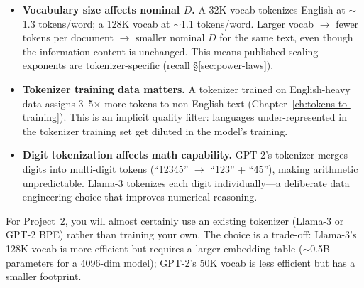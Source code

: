 \begin{itemize}[nosep]
  \item \textbf{Vocabulary size affects nominal $D$.} A 32K vocab tokenizes English at $\sim$1.3 tokens/word; a 128K vocab at $\sim$1.1 tokens/word. Larger vocab $\to$ fewer tokens per document $\to$ smaller nominal $D$ for the same text, even though the information content is unchanged. This means published scaling exponents are tokenizer-specific (recall \S\ref{sec:power-laws}).
  \item \textbf{Tokenizer training data matters.} A tokenizer trained on English-heavy data assigns 3--5$\times$ more tokens to non-English text (Chapter~\ref{ch:tokens-to-training}). This is an implicit quality filter: languages under-represented in the tokenizer training set get diluted in the model's training.
  \item \textbf{Digit tokenization affects math capability.} GPT-2's tokenizer merges digits into multi-digit tokens (``12345'' $\to$ ``123'' + ``45''), making arithmetic unpredictable. Llama-3 tokenizes each digit individually---a deliberate data engineering choice that improves numerical reasoning.
\end{itemize}

\noindent{}

\medskip
For Project~2, you will almost certainly use an existing tokenizer (Llama-3 or GPT-2 BPE) rather than training your own. The choice is a trade-off: Llama-3's 128K vocab is more efficient but requires a larger embedding table ($\sim$0.5B parameters for a 4096-dim model); GPT-2's 50K vocab is less efficient but has a smaller footprint.

